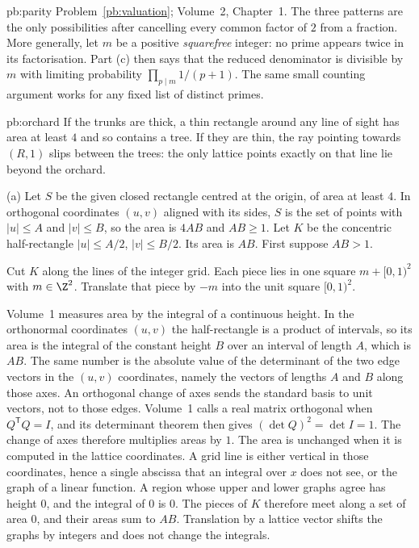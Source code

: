 \begin{solution}{pb:parity}
\tools Problem~\ref{pb:valuation}; Volume~2, Chapter~1.
\leads The three patterns are the only possibilities after
cancelling every common factor of $2$ from a fraction. More generally,
let $m$ be a positive \emph{squarefree} integer: no prime appears
twice in its factorisation. Part (c) then says that the reduced
denominator is divisible by $m$ with limiting probability
$\prod_{p\mid m}1/(p+1)$. The same small counting argument works
for any fixed list of distinct primes.
\end{solution}

\begin{solution}{pb:orchard}
\idea If the trunks are thick, a thin rectangle around any line of sight has area at least $4$ and so contains a tree. If they are
thin, the ray pointing towards $(R,1)$ slips between the trees: the only lattice points exactly on that line lie beyond the orchard.

\writeup (a) Let $S$ be the given closed rectangle centred at the origin, of area at least $4$. In orthogonal coordinates $(u,v)$ aligned with its sides, $S$ is the set of points with $|u|\le A$ and $|v|\le B$, so the area is $4AB$ and $AB\ge1$. Let $K$ be the concentric half-rectangle $|u|\le A/2$, $|v|\le B/2$. Its area is $AB$. First suppose $AB>1$.

Cut $K$ along the lines of the integer grid. Each piece lies in one square $m+[0,1)^2$ with $m\in\Z^2$. Translate that piece by $-m$ into the unit square $[0,1)^2$.

Volume~1 measures area by the integral of a continuous height. In the orthonormal coordinates $(u,v)$ the half-rectangle is a product of intervals, so its area is the integral of the constant height $B$ over an interval of length $A$, which is $AB$. The same number is the absolute value of the determinant of the two edge vectors in the $(u,v)$ coordinates, namely the vectors of lengths $A$ and $B$ along those axes. An orthogonal change of axes sends the standard basis to unit vectors, not to those edges. Volume~1 calls a real matrix orthogonal when $Q^{\mathsf T}Q=I$, and its determinant theorem then gives $(\det Q)^2=\det I=1$. The change of axes therefore multiplies areas by $1$. The area is unchanged when it is computed in the lattice coordinates. A grid line is either vertical in those coordinates, hence a single abscissa that an integral over $x$ does not see, or the graph of a linear function. A region whose upper and lower graphs agree has height $0$, and the integral of $0$ is $0$. The pieces of $K$ therefore meet along a set of area $0$, and their areas sum to $AB$. Translation by a lattice vector shifts the graphs by integers and does not change the integrals.


\end{solution}
